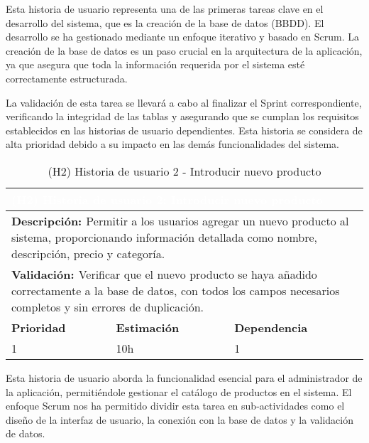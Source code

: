    Esta historia de usuario representa una de las primeras tareas clave en el desarrollo del sistema, que es la creación de la base de datos (BBDD). El desarrollo se ha gestionado mediante un enfoque iterativo y basado en Scrum. La creación de la base de datos es un paso crucial en la arquitectura de la aplicación, ya que asegura que toda la información requerida por el sistema esté correctamente estructurada.

    \vspace{0.5cm}
    
    La validación de esta tarea se llevará a cabo al finalizar el Sprint correspondiente, verificando la integridad de las tablas y asegurando que se cumplan los requisitos establecidos en las historias de usuario dependientes. Esta historia se considera de alta prioridad debido a su impacto en las demás funcionalidades del sistema.


\begin{table}[H]
  \centering
  \renewcommand{\arraystretch}{1.5}
  \begin{tabular}{|p{}|p{}|p{}|}
    \hline
    \multicolumn{3}{|l|}{\cellcolor{OrangeVIU}\textcolor{white}{\textbf{(H2) Historia de usuario 2: Introducir nuevo producto}}} \\
    \hline
    \multicolumn{3}{|p{\dimexpr0.9\linewidth+2\tabcolsep+2\arrayrulewidth}|}{{\textbf{\textcolor{naranja}{Descripción: }}}Permitir a los usuarios agregar un nuevo producto al sistema, proporcionando información detallada como nombre, descripción, precio y categoría.} \\
    \hline
    \multicolumn{3}{|p{\dimexpr0.9\linewidth+2\tabcolsep+2\arrayrulewidth}|}{{\textbf{\textcolor{naranja}{Validación: }} Verificar que el nuevo producto se haya añadido correctamente a la base de datos, con todos los campos necesarios completos y sin errores de duplicación. }} \\
    \hline
    {\textbf{\textcolor{naranja}{Prioridad }}}  & {\textbf{\textcolor{naranja}{Estimación }}}  & {\textbf{\textcolor{naranja}{Dependencia }}}  \\
    \hline
    1 &  10h &  1 \\
    \hline
  \end{tabular}
  \caption{(H2) Historia de usuario 2 - Introducir nuevo producto}
  \label{table:H2}
\end{table}


    Esta historia de usuario aborda la funcionalidad esencial para el administrador de la aplicación, permitiéndole gestionar el catálogo de productos en el sistema. El enfoque Scrum nos ha permitido dividir esta tarea en sub-actividades como el diseño de la interfaz de usuario, la conexión con la base de datos y la validación de datos.


